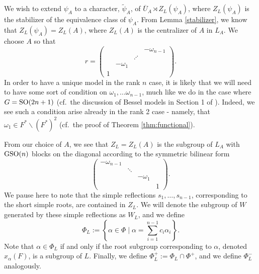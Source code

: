 \documentclass[11pt,letterpaper]{article}
\newcommand{\bs}{\backslash}
\newcommand{\SO}{\textup{SO}}
\newcommand{\GSO}{\textup{GSO}}
\theoremstyle{remark}
\numberwithin{equation}{section}
\begin{document}


We wish to extend $\psi_A$ to a character, $\widetilde{\psi}_A$, of $\overline{U}_A \rtimes Z_L(\psi_A)$, where $Z_L(\psi_A)$ is the stabilizer of the equivalence class of $\psi_A$. From Lemma \ref{stabilizer}, we know that $Z_L(\psi_A) = Z_L(A)$, where $Z_L(A)$ is the centralizer of $A$ in $L_A$. We choose $A$ so that 
$$r = \begin{pmatrix} & & & -\omega_{n-1} \\ & & \iddots & \\ & -\omega_1 & &  \\ 1 & & & \end{pmatrix}.$$ In order to have a unique model in the rank $n$ case, it is likely that we will need to have some sort of condition on $\omega_1,\hdots \omega_{n-1}$, much like we do in the case where $G = \SO(2n+1)$ (cf.~the discussion of Bessel models in Section 1 of \cite{BFF}). Indeed, we see such a condition arise already in the rank 2 case - namely, that $\omega_1 \in F^{\ast}\bs (F^{\ast})^2$ (cf.~the proof of Theorem \ref{thm:functional}).

From our choice of $A$, we see that $Z_L = Z_L(A)$ is the subgroup of $L_A$ with $\GSO(n)$ blocks on the diagonal according to the symmetric bilinear form $$\begin{pmatrix} -\omega_{n-1} & & & \\ & \ddots & & \\ & & -\omega_1 & \\ & & & 1 \end{pmatrix}.$$ We pause here to note that the simple reflections $s_1,\hdots, s_{n-1}$, corresponding to the short simple roots, are contained in $Z_L$. We will denote the subgroup of $W$ generated by these simple reflections as $W_L$, and we define $$\Phi_L := \left\{\alpha \in \Phi \mid \alpha = \sum_{i=1}^{n-1} c_i\alpha_i\right\}.$$ Note that $\alpha \in \Phi_L$ if and only if the root subgroup corresponding to $\alpha$, denoted $x_{\alpha}(F)$, is a subgroup of $L$. Finally, we define $\Phi_L^+ := \Phi_L \cap \Phi^+$, and we define $\Phi_L^-$ analogously.
\end{document}
